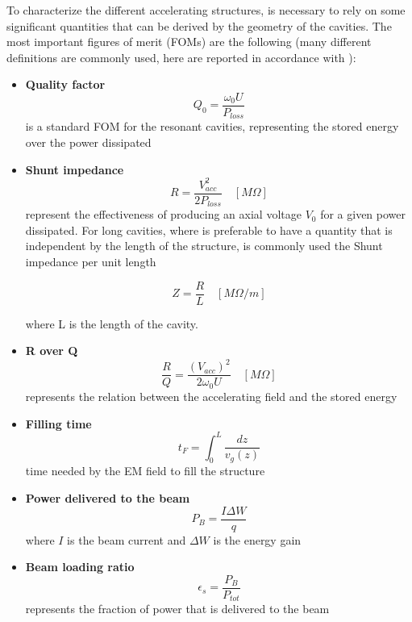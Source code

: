 To characterize the different accelerating structures, is necessary to rely on some significant quantities that can be derived by the geometry of the cavities. The most important figures of merit (FOMs) are the following (many different definitions are commonly used, here are reported in accordance with \cite{TECKER:RFCAS}):
\begin{itemize}

\item \textbf{Quality factor} 
\begin{equation}
Q_0 = \frac{\omega_0 U}{P_{loss}} 
\end{equation}
is a standard FOM for the resonant cavities, representing the stored energy over the power dissipated

\item \textbf{Shunt impedance} 
\begin{equation}
R = \frac{V_{acc}^2}{2P_{loss}}  \quad [M\Omega]
\end{equation}
represent the effectiveness of producing an axial voltage $V_0$ for a given power dissipated. For long cavities, where is preferable to have a quantity that is independent by the length of the structure, is commonly used the Shunt impedance per unit length

\begin{equation}
Z = \frac{R}{L}  \quad [M\Omega / m]
\end{equation}

where L is the length of the cavity.

\item \textbf{R over Q} 
\begin{equation}
\frac{R}{Q} = \frac{(V_{acc})^2}{2\omega_0 U}  \quad [M\Omega]
\end{equation}
represents the relation between the accelerating field and the stored energy


\item \textbf{Filling time}
\begin{equation}
t_F = \int_0^L \frac{dz}{v_g (z)}
\end{equation}
time needed by the EM field to fill the structure

\item \textbf{Power delivered to the beam}
\begin{equation}
P_B = \frac{I \Delta W}{q}
\end{equation}
where $I$ is the beam current and $\Delta W$ is the energy gain

\item \textbf{Beam loading ratio}
\begin{equation}
\epsilon_s = \frac{P_B}{P_{tot}}
\end{equation}
represents the fraction of power that is delivered to the beam

\end{itemize}


